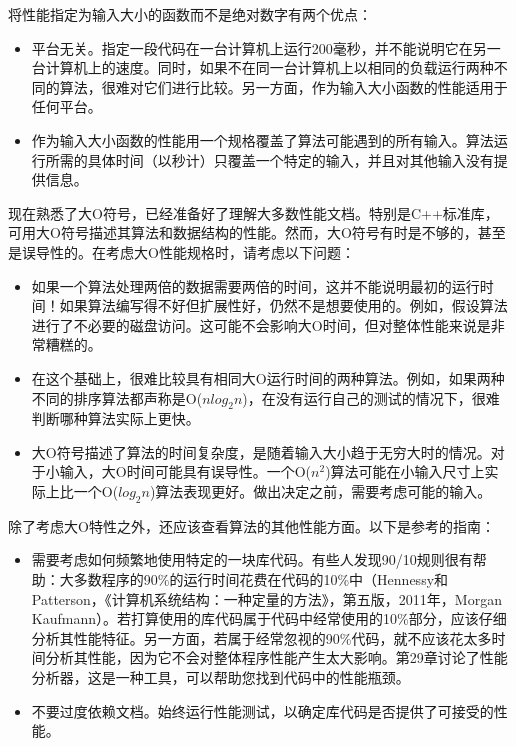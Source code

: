 将性能指定为输入大小的函数而不是绝对数字有两个优点：

\begin{itemize}
\item
平台无关。指定一段代码在一台计算机上运行200毫秒，并不能说明它在另一台计算机上的速度。同时，如果不在同一台计算机上以相同的负载运行两种不同的算法，很难对它们进行比较。另一方面，作为输入大小函数的性能适用于任何平台。

\item
作为输入大小函数的性能用一个规格覆盖了算法可能遇到的所有输入。算法运行所需的具体时间（以秒计）只覆盖一个特定的输入，并且对其他输入没有提供信息。
\end{itemize}


现在熟悉了大O符号，已经准备好了理解大多数性能文档。特别是C++标准库，可用大O符号描述其算法和数据结构的性能。然而，大O符号有时是不够的，甚至是误导性的。在考虑大O性能规格时，请考虑以下问题：

\begin{itemize}
\item
如果一个算法处理两倍的数据需要两倍的时间，这并不能说明最初的运行时间！如果算法编写得不好但扩展性好，仍然不是想要使用的。例如，假设算法进行了不必要的磁盘访问。这可能不会影响大O时间，但对整体性能来说是非常糟糕的。

\item
在这个基础上，很难比较具有相同大O运行时间的两种算法。例如，如果两种不同的排序算法都声称是O($n log_2 n$)，在没有运行自己的测试的情况下，很难判断哪种算法实际上更快。

\item
大O符号描述了算法的时间复杂度，是随着输入大小趋于无穷大时的情况。对于小输入，大O时间可能具有误导性。一个O($n^2$)算法可能在小输入尺寸上实际上比一个O($log_2 n$)算法表现更好。做出决定之前，需要考虑可能的输入。
\end{itemize}

除了考虑大O特性之外，还应该查看算法的其他性能方面。以下是参考的指南：

\begin{itemize}
\item
需要考虑如何频繁地使用特定的一块库代码。有些人发现90/10规则很有帮助：大多数程序的90\%的运行时间花费在代码的10\%中（Hennessy和Patterson，《计算机系统结构：一种定量的方法》，第五版，2011年，Morgan Kaufmann）。若打算使用的库代码属于代码中经常使用的10\%部分，应该仔细分析其性能特征。另一方面，若属于经常忽视的90\%代码，就不应该花太多时间分析其性能，因为它不会对整体程序性能产生太大影响。第29章讨论了性能分析器，这是一种工具，可以帮助您找到代码中的性能瓶颈。

\item
不要过度依赖文档。始终运行性能测试，以确定库代码是否提供了可接受的性能。
\end{itemize}

